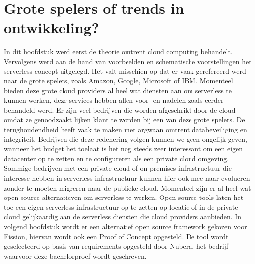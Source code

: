 \section{Grote spelers of trends in ontwikkeling?}
In dit hoofdstuk werd eerst de theorie omtrent cloud computing behandelt. Vervolgens werd aan de hand van voorbeelden en schematische voorstellingen het serverless concept uitgelegd. Het valt misschien op dat er vaak gerefereerd werd naar de grote spelers, zoals Amazon, Google, Microsoft of IBM. Momenteel bieden deze grote cloud providers al heel wat diensten aan om serverless te kunnen werken, deze services hebben allen voor- en nadelen zoals eerder behandeld werd. Er zijn veel bedrijven die worden afgeschrikt door de cloud omdat ze genoodzaakt lijken klant te worden bij een van deze grote spelers. De terughoudendheid heeft vaak te maken met argwaan omtrent databeveiliging en integriteit. Bedrijven die deze redenering volgen kunnen we geen ongelijk geven, wanneer het budget het toelaat is het nog steeds zeer interessant om een eigen datacenter op te zetten en te configureren als een private cloud omgeving. Sommige bedrijven met een private cloud of on-premises infrastructuur die interesse hebben in serverless infrastructuur kunnen hier ook mee naar evolueren zonder te moeten migreren naar de publieke cloud. Momenteel zijn er al heel wat open source alternatieven om serverless te werken. Open source tools laten het toe een eigen serverless infrastructuur op te zetten op locatie of in de private cloud gelijkaardig aan de serverless diensten die cloud providers aanbieden. In volgend hoofdstuk wordt er een alternatief open source framework gekozen voor Fission, hiervan wordt ook een Proof of Concept opgesteld. De tool wordt geselecteerd op basis van requirements opgesteld door Nubera, het bedrijf waarvoor deze bachelorproef wordt geschreven.

